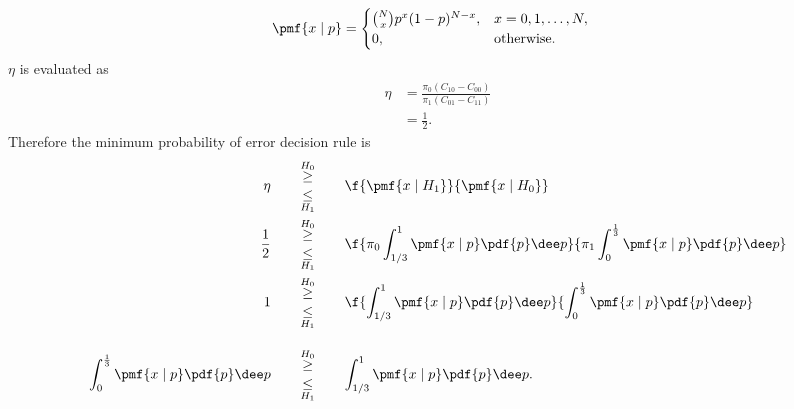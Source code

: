 \begin{example}
    \begin{align}
    \pmf{x \mid p} &= 
    \begin{cases}
        {N \choose x} p^{x}(1-p)^{N-x}, &x = 0, 1, \ldots, N,\\
        0, &\text{otherwise}.
    \end{cases}
    \end{align}
    $\eta$ is evaluated as
    \begin{align}
        \eta &= \frac{\pi_0(C_{10}-C_{00})}{\pi_1(C_{01}-C_{11})} \\
            &= \frac{1}{2}.
    \end{align}
    Therefore the minimum probability of error decision rule is 
    \begin{align}
        \eta\qquad
        {\overset{H_{0}}{\geq}\atop \underset{H_{1}}{\leq}}&\qquad
        \f{\pmf{x\mid H_{1}}}{\pmf{x\mid H_{0}}} \\
        \frac{1}{2}\qquad
        {\overset{H_{0}}{\geq}\atop \underset{H_{1}}{\leq}}&\qquad
        \f{\pi_{0} \int_{1/3}^{1} \pmf{x \mid p}\pdf{p}\dee p}{\pi_{1} \int_{0}^{\frac{1}{3}} \pmf{x \mid p}\pdf{p}\dee p} \\
        1 \qquad
        {\overset{H_{0}}{\geq}\atop \underset{H_{1}}{\leq}}&\qquad
        \f{ \int_{1/3}^{1} \pmf{x \mid p}\pdf{p}\dee p}{ \int_{0}^{\frac{1}{3}} \pmf{x \mid p}\pdf{p}\dee p}\\[10pt]
        { \int_{0}^{\frac{1}{3}} \pmf{x \mid p}\pdf{p}\dee p} \qquad
        {\overset{H_{0}}{\geq}\atop \underset{H_{1}}{\leq}}&\qquad
        { \int_{1/3}^{1} \pmf{x \mid p}\pdf{p}\dee p}.
    \end{align}

    \triqed
\end{example}
